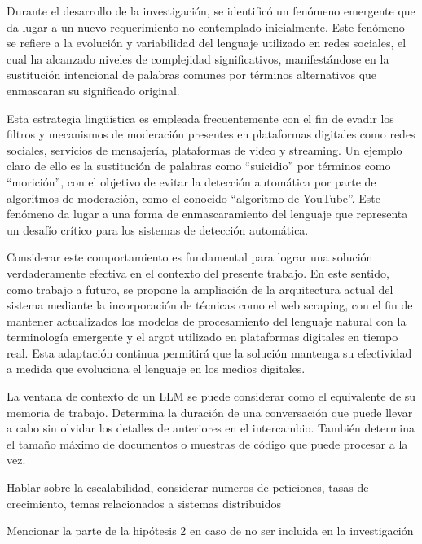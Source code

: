 Durante el desarrollo de la investigación, se identificó un fenómeno emergente que da lugar a un nuevo requerimiento no contemplado inicialmente. Este fenómeno se refiere a la evolución y variabilidad del lenguaje utilizado en redes sociales, el cual ha alcanzado niveles de complejidad significativos, manifestándose en la sustitución intencional de palabras comunes por términos alternativos que enmascaran su significado original.

Esta estrategia lingüística es empleada frecuentemente con el fin de evadir los filtros y mecanismos de moderación presentes en plataformas digitales como redes sociales, servicios de mensajería, plataformas de video y streaming. Un ejemplo claro de ello es la sustitución de palabras como “suicidio” por términos como “morición”, con el objetivo de evitar la detección automática por parte de algoritmos de moderación, como el conocido “algoritmo de YouTube”. Este fenómeno da lugar a una forma de enmascaramiento del lenguaje que representa un desafío crítico para los sistemas de detección automática.

Considerar este comportamiento es fundamental para lograr una solución verdaderamente efectiva en el contexto del presente trabajo. En este sentido, como trabajo a futuro, se propone la ampliación de la arquitectura actual del sistema mediante la incorporación de técnicas como el web scraping, con el fin de mantener actualizados los modelos de procesamiento del lenguaje natural con la terminología emergente y el argot utilizado en plataformas digitales en tiempo real. Esta adaptación continua permitirá que la solución mantenga su efectividad a medida que evoluciona el lenguaje en los medios digitales.


La ventana de contexto de un LLM se puede considerar como el equivalente de su memoria de trabajo. Determina la duración de una conversación que puede llevar a cabo sin olvidar los detalles de anteriores en el intercambio. También determina el tamaño máximo de documentos o muestras de código que puede procesar a la vez.
\cite{ibmVentanaContexto}
\cite{AnthropicVentanaContexto}

Hablar sobre la escalabilidad, considerar numeros de peticiones, tasas de crecimiento, temas relacionados a sistemas distribuidos

Mencionar la parte de la hipótesis 2 en caso de no ser incluida en la investigación


